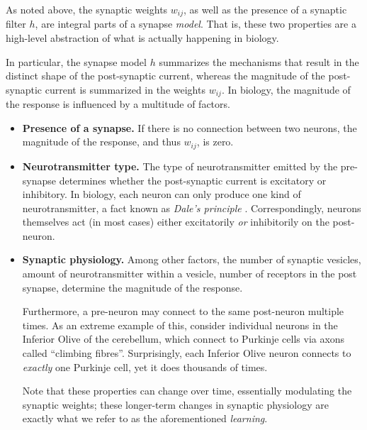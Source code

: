 \documentclass[10pt,letterpaper,oneside]{article}
\begin{document}
	As noted above, the synaptic weights $w_{ij}$, as well as the presence of a synaptic filter $h$, are integral parts of a synapse \emph{model}. That is, these two properties are a high-level abstraction of what is actually happening in biology.

	In particular, the synapse model $h$ summarizes the mechanisms that result in the distinct shape of the post-synaptic current, whereas the magnitude of the post-synaptic current is summarized in the weights $w_{ij}$. In biology, the magnitude of the response is influenced by a multitude of factors.
	\begin{itemize}
		\item \textbf{Presence of a synapse.}
		      If there is no connection between two neurons, the magnitude of the response, and thus $w_{ij}$, is zero.
		\item \textbf{Neurotransmitter type.}
		      The type of neurotransmitter emitted by the pre-synapse determines whether the post-synaptic current is excitatory or inhibitory. In biology, each neuron can only produce one kind of neurotransmitter, a fact known as \emph{Dale's principle} \cite{strata1999dale}. Correspondingly, neurons themselves act (in most cases) either excitatorily \emph{or} inhibitorily on the post-neuron.
		\item \textbf{Synaptic physiology.}
		      Among other factors, the number of synaptic vesicles, amount of neurotransmitter within a vesicle, number of receptors in the post synapse, determine the magnitude of the response.
		      
		      Furthermore, a pre-neuron may connect to the same post-neuron multiple times. As an extreme example of this, consider individual neurons in the Inferior Olive of the cerebellum, which connect to Purkinje cells via axons called \enquote{climbing fibres}. Surprisingly, each Inferior Olive neuron connects to \emph{exactly} one Purkinje cell, yet it does thousands of times.

		      Note that these properties can change over time, essentially modulating the synaptic weights; these longer-term changes in synaptic physiology are exactly what we refer to as the aforementioned \emph{learning}.
	\end{itemize}
	
\end{document}
